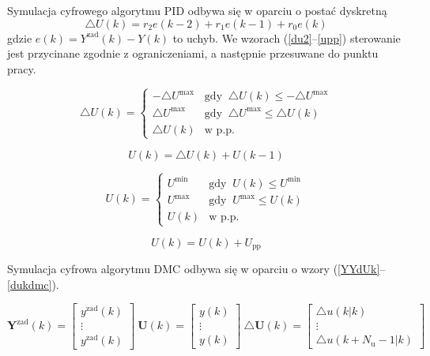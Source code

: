 Symulacja cyfrowego algorytmu PID odbywa się w oparciu o postać dyskretną
\begin{equation}
\triangle U(k) = r_2 e(k-2) + r_1 e(k-1) + r_0 e(k)
\label{du}
\end{equation}
gdzie $e(k)=Y^{\mathrm{zad}}(k) - Y(k)$ to uchyb. We wzorach (\ref{du2}--\ref{upp}) sterowanie jest przycinane zgodnie z ograniczeniami, a następnie przesuwane do punktu pracy.

\begin{equation}
\triangle U(k) = 
\begin{cases}
-\triangle U^{\mathrm{max}} & \textrm{gdy } \ \triangle U(k) \le -\triangle U^{\mathrm{max}} \\
\triangle U^{\mathrm{max}} & \textrm{gdy } \ \triangle U^{\mathrm{max}} \le \triangle U(k) \\
\triangle U(k) & \textrm{w p.p.}
\end{cases}
\label{du2}
\end{equation}

\begin{equation}
U(k) = \triangle U(k) + U(k-1)
\label{uk}
\end{equation}

\begin{equation}
U(k) = 
\begin{cases}
U^{\mathrm{min}} & \textrm{gdy } \ U(k) \le U^{\mathrm{min}} \\
U^{\mathrm{max}} & \textrm{gdy } \ U^{\mathrm{max}} \le U(k) \\
U(k) & \textrm{w p.p.}
\end{cases}
\label{uk2}
\end{equation}

\begin{equation}
U(k) = U(k) + U_{\mathrm{pp}}
\label{upp}
\end{equation}

Symulacja cyfrowa algorytmu DMC odbywa się w oparciu o wzory (\ref{YYdUk}--\ref{dukdmc}).

\begin{equation}
\boldsymbol{Y}^{\mathrm{zad}}(k)=\left[
\begin{array}{c}
y^{\mathrm{zad}}(k)\\
\vdots\\
y^{\mathrm{zad}}(k)
\end{array}
\right] \
\boldsymbol{U}(k)=\left[
\begin{array}{c}
y(k)\\
\vdots\\
y(k)
\end{array}
\right] \
\triangle \boldsymbol{U}(k)=\left[
\begin{array}{c}
\triangle u(k|k)\\
\vdots\\
\triangle u(k+N_{\mathrm{u}}-1|k)
\end{array}
\right] \
\label{YYdUk}
\end{equation}


